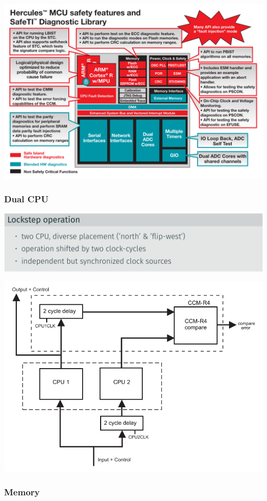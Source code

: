 \documentclass[
  10pt,
  a4paper,
]{article}
\begin{document}
\begin{multicols*}{2}
\includegraphics{images/safety/image-22.png}

\subsubsection{Dual CPU}\label{dual-cpu}

\includegraphics{images/safety/image-26.png}

\includegraphics{images/safety/image-23.png}

\subsubsection{Memory}\label{memory}


\end{multicols*}
\end{document}
